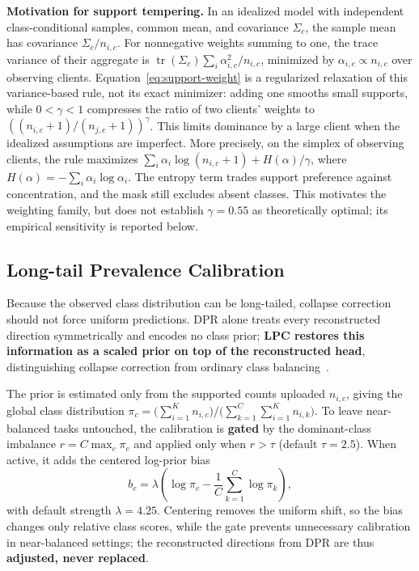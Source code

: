 \documentclass[journal,twoside,web]{ieeecolor}
\begin{document}
\textbf{Motivation for support tempering.} In an idealized model with independent class-conditional samples, common mean, and covariance $\Sigma_c$, the sample mean has covariance $\Sigma_c/n_{i,c}$. For nonnegative weights summing to one, the trace variance of their aggregate is $\operatorname{tr}(\Sigma_c)\sum_i\alpha_{i,c}^2/n_{i,c}$, minimized by $\alpha_{i,c}\propto n_{i,c}$ over observing clients. Equation~\ref{eq:support-weight} is a regularized relaxation of this variance-based rule, not its exact minimizer: adding one smooths small supports, while $0<\gamma<1$ compresses the ratio of two clients' weights to $((n_{i,c}+1)/(n_{j,c}+1))^\gamma$. This limits dominance by a large client when the idealized assumptions are imperfect. More precisely, on the simplex of observing clients, the rule maximizes $\sum_i\alpha_i\log(n_{i,c}+1)+H(\alpha)/\gamma$, where $H(\alpha)=-\sum_i\alpha_i\log\alpha_i$. The entropy term trades support preference against concentration, and the mask still excludes absent classes. This motivates the weighting family, but does not establish $\gamma=0.55$ as theoretically optimal; its empirical sensitivity is reported below.

\subsection{Long-tail Prevalence Calibration}

Because the observed class distribution can be long-tailed, collapse correction should not force uniform predictions. DPR alone treats every reconstructed direction symmetrically and encodes no class prior; \textbf{LPC restores this information as a scaled prior on top of the reconstructed head}, distinguishing collapse correction from ordinary class balancing~\cite{cao2019ldam,cui2019classbalanced,kang2020decoupling,ren2020balanced}.

The prior is estimated only from the supported counts uploaded $n_{i,c}$, giving the global class distribution $\pi_c=\big(\sum_{i=1}^{K}n_{i,c}\big)/\big(\sum_{k=1}^{C}\sum_{i=1}^{K}n_{i,k}\big)$. To leave near-balanced tasks untouched, the calibration is \textbf{gated} by the dominant-class imbalance $r=C\max_c\pi_c$ and applied only when $r>\tau$ (default $\tau=2.5$). When active, it adds the centered log-prior bias
\begin{equation}
b_c=\lambda\left(\log\pi_c-\frac{1}{C}\sum_{k=1}^{C}\log\pi_k\right),
\end{equation}
with default strength $\lambda=4.25$. Centering removes the uniform shift, so the bias changes only relative class scores, while the gate prevents unnecessary calibration in near-balanced settings; the reconstructed directions from DPR are thus \textbf{adjusted, never replaced}.
\end{document}
